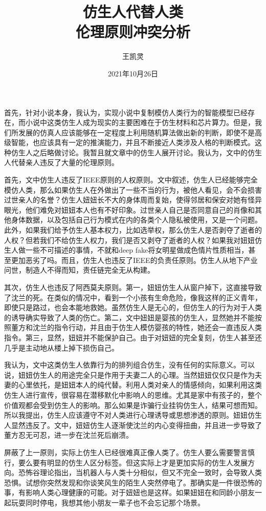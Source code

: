 \documentclass{article}
\title{\textbf{\zihao{2}仿生人代替人类}\\\zihao{3}伦理原则冲突分析}
\author{王凯灵}
\date{2021年10月26日}
\begin{document}
	\maketitle
	首先，针对小说本身，我认为，实现小说中复制模仿人类行为的智能模型已经存在，而小说中这类仿生人成为现实的主要困难在于仿生材料和芯片算力。但是，我们所发展的仿真人应该能够在一定程度上利用随机算法做出新的判断，即使不是高级智能，也应该具有一定的推演能力，并且不断接近人类涉及人格的判断模式。这种仿生人之后略做讨论。我暂且就文章中的仿生人展开讨论。我认为，文中的仿生人代替亲人违反了大量的伦理原则。

	首先，文中仿生人违反了IEEE原则的人权原则。文中叙述，仿生人已经能够完全模仿人类，那么如果仿生人在外做出了一些不当的行为，被他人看见，会不会损害过世亲人的名誉？仿生人妞妞长不大的身体周而复始，使得邻居和保安对她有怪异眼光，他们难免对妞妞本人也有不好印象。过世亲人自己是否同意自己的肖像和其他身体数据，以及包括自己行为模式在内的各类个人隐私被使用，又是一个问题。此外，如果我们给予仿生人基本权力，比如选举权，那么仿生人是否剥夺了逝者的人权？但若我们不给仿生人权力，我们是否又剥夺了逝者的人权？如果我对妞妞仿生人做一些不可描述的事情，不就和deep fake将女明星做成色情片性质相当，甚至更加恶劣了吗。而且，仿生人也违反了IEEE的负责任原则。仿生人从地下产业问世，制造人不得而知，责任链完全无从构建。

	其次，仿生人也违反了阿西莫夫原则。第一，妞妞仿生人从窗户掉下，这直接导致了沈兰的死。在类似的情况中，看到一个小孩有生命危险，像我这样的正义青年，即使只是路过，也会本能地救她。虽然仿生人是无心的，但仿生人的行为对于人类的诱导确实导致了人类的伤亡。第二，文中妞妞是婴孩的仿生人，显然她并不能按照董方和沈兰的指令行动，并且由于仿生人模仿婴孩的特性，她还会一直违反人类指令。第三，显然，妞妞并不能保护自己。由于对妞妞的完全复刻，仿生人甚至还几乎是主动地从楼上掉下损伤自己。

	我认为，文中这类仿生人依靠行为的排列组合仿生，没有任何的实际意义。可以说，妞妞仿生人的用途完全只是作用于夫妻二人的心理。当然妞妞仅仅只是作为夫妻的心里依托，是妞妞本人的纯代替。利用人类对亲人的情感倾向，如果利用这类仿生人进行宣传，很容易在潜移默化中影响人的思维。尤其是家中有孩子的，整个价值观都会受到仿生人的影响。那么如果是诈骗行业挂钩仿生人，结果可想而知。所以我提出，仿生人应该遵守不对人类进行心理诱导或思想渗透的原则。妞妞仿生人显然违反了。文中，妞妞仿生人逐渐使沈兰的内心变得扭曲，并且进一步导致了董方忍无可忍，进一步在沈兰死后崩溃。

	屏蔽了上一原则，实际上仿生人已经很难真正像人类了。仿生人要么需要警言慎行，要么要有明显的仿生人区分标签。但这实际上才是更加实际的仿生人发展方向。恐怖谷理论指出，当机器人与人类十分相似，但又不完全一致时，会导致人类恐惧。试想你突然发现和你谈笑风生的陌生人突然停电了。那确实是一件很恐怖的事，有影响人类心理健康的可能。对于妞妞也是这样。如果妞妞在和同龄小朋友一起玩耍同时停电，我想其他小朋友一辈子也不会忘记那个场景。
\end{document}
